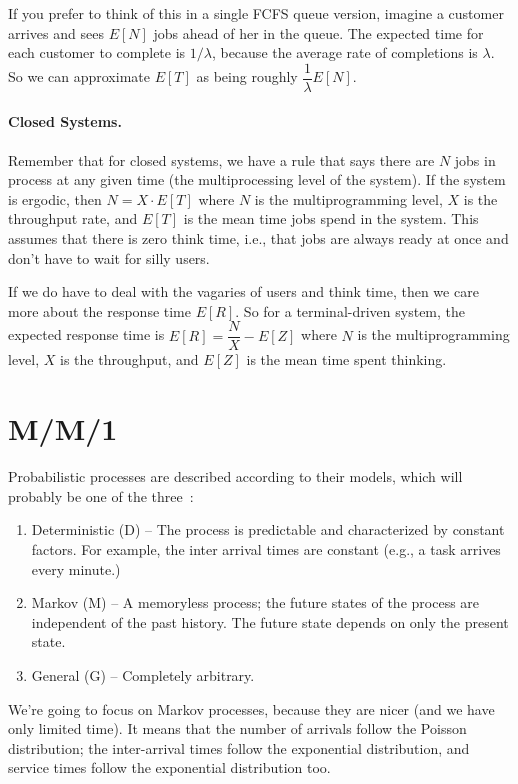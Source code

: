 If you prefer to think of this in a single FCFS queue version, imagine a customer arrives and sees $E[N]$ jobs ahead of her in the queue. The expected time for each customer to complete is $1/\lambda$, because the average rate of completions is $\lambda $. So we can approximate $E[T]$ as being roughly $\dfrac{1}{\lambda}E[N]$.

\paragraph{Closed Systems.} Remember that for closed systems, we have a rule that says there are $N$ jobs in process at any given time (the multiprocessing level of the system). If the system is ergodic, then $N = X \cdot E[T]$ where $N$ is the multiprogramming level, $X$ is the throughput rate, and $E[T]$ is the mean time jobs spend in the system. This assumes that there is zero think time, i.e., that jobs are always ready at once and don't have to wait for silly users.

If we do have to deal with the vagaries of users and think time, then we care more about the response time $E[R]$. So for a terminal-driven system, the expected response time is $E[R] = \dfrac{N}{X} - E[Z]$ where $N$ is the multiprogramming level, $X$ is the throughput, and $E[Z]$ is the mean time spent thinking. 

\section*{M/M/1}

Probabilistic processes are described according to their models, which will probably be one of the three~\cite{swps}:

\begin{enumerate}
	\item Deterministic (D) -- The process is predictable and characterized by constant factors. For example, the inter arrival times are constant (e.g., a task arrives every minute.)
	\item Markov (M) -- A memoryless process; the future states of the process are independent of the past history. The future state depends on only the present state.
	\item General (G) -- Completely arbitrary.
\end{enumerate}

We're going to focus on Markov processes, because they are nicer (and we have only limited time). It means that the number of arrivals follow the Poisson distribution; the inter-arrival times follow the exponential distribution, and service times follow the exponential distribution too. 

